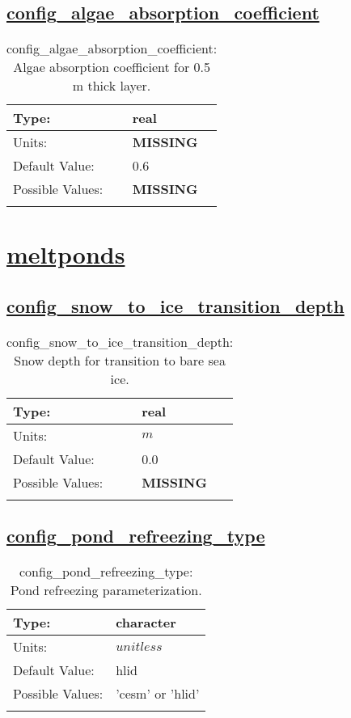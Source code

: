 \subsection[config\_algae\_absorption\_coefficient]{\hyperref[sec:nm_tab_shortwave]{config\_algae\_absorption\_coefficient}}
\label{subsec:nm_sec_config_algae_absorption_coefficient}
\begin{center}
\begin{longtable}{| p{2.0in} || p{4.0in} |}
    \hline
    Type: & real \\
    \hline
    Units: & {\bf \color{red} MISSING} \\
    \hline
    Default Value: & 0.6 \\
    \hline
    Possible Values: & {\bf \color{red} MISSING} \\
    \hline
    \caption{config\_algae\_absorption\_coefficient: Algae absorption coefficient for 0.5 m thick layer.}
\end{longtable}
\end{center}
\section[meltponds]{\hyperref[sec:nm_tab_meltponds]{meltponds}}
\label{sec:nm_sec_meltponds}
\subsection[config\_snow\_to\_ice\_transition\_depth]{\hyperref[sec:nm_tab_meltponds]{config\_snow\_to\_ice\_transition\_depth}}
\label{subsec:nm_sec_config_snow_to_ice_transition_depth}
\begin{center}
\begin{longtable}{| p{2.0in} || p{4.0in} |}
    \hline
    Type: & real \\
    \hline
    Units: & $m$ \\
    \hline
    Default Value: & 0.0 \\
    \hline
    Possible Values: & {\bf \color{red} MISSING} \\
    \hline
    \caption{config\_snow\_to\_ice\_transition\_depth: Snow depth for transition to bare sea ice.}
\end{longtable}
\end{center}
\subsection[config\_pond\_refreezing\_type]{\hyperref[sec:nm_tab_meltponds]{config\_pond\_refreezing\_type}}
\label{subsec:nm_sec_config_pond_refreezing_type}
\begin{center}
\begin{longtable}{| p{2.0in} || p{4.0in} |}
    \hline
    Type: & character \\
    \hline
    Units: & $unitless$ \\
    \hline
    Default Value: & hlid \\
    \hline
    Possible Values: & 'cesm' or 'hlid' \\
    \hline
    \caption{config\_pond\_refreezing\_type: Pond refreezing parameterization.}
\end{longtable}
\end{center}
